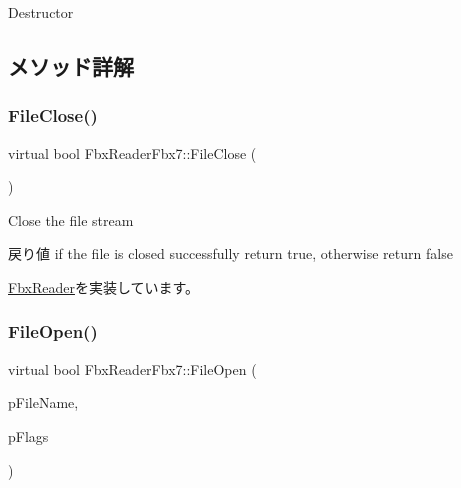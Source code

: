 Destructor 

\subsection{メソッド詳解}
\mbox{\label{class_fbx_reader_fbx7_a06f5323e8d483a1103d54fc53cceadc9}} 
\subsubsection{\texorpdfstring{File\+Close()}{FileClose()}}
{\footnotesize\ttfamily virtual bool Fbx\+Reader\+Fbx7\+::\+File\+Close (\begin{DoxyParamCaption}{ }\end{DoxyParamCaption})\hspace{0.3cm}{\ttfamily [virtual]}}

Close the file stream \begin{DoxyReturn}{戻り値}
if the file is closed successfully return {\ttfamily true}, otherwise return {\ttfamily false} 
\end{DoxyReturn}


\hyperlink{class_fbx_reader_a327df94e5c24315fc5cbcedf0e7bb615}{Fbx\+Reader}を実装しています。

\mbox{\label{class_fbx_reader_fbx7_a003c93fdf81dc99380d0276e7643ac26}} 
\subsubsection{\texorpdfstring{File\+Open()}{FileOpen()}\hspace{0.1cm}{\footnotesize\ttfamily [1/4]}}
{\footnotesize\ttfamily virtual bool Fbx\+Reader\+Fbx7\+::\+File\+Open (\begin{DoxyParamCaption}\item[{char $\ast$}]{p\+File\+Name,  }\item[{\hyperlink{class_fbx_reader_a1a14bd907bcda7dd48ba9b0a6236b7b8}{E\+File\+Open\+Special\+Flags}}]{p\+Flags }\end{DoxyParamCaption})\hspace{0.3cm}{\ttfamily [virtual]}}

